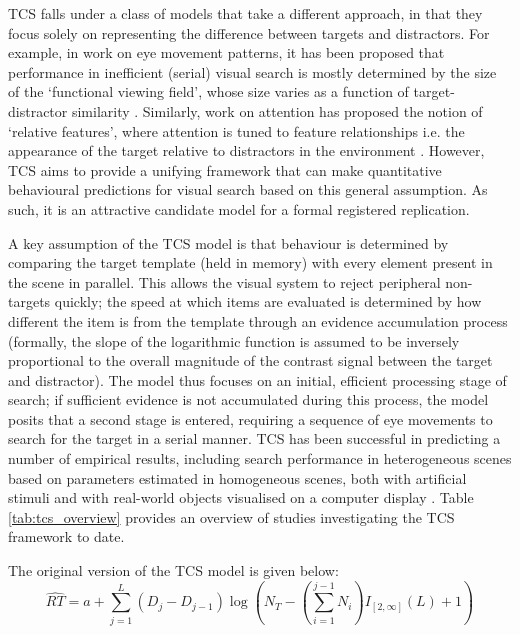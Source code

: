 \documentclass[smallextended, natbib]{svjour3}       %
\begin{document}
TCS falls under a class of models that take a different approach, in that they focus solely on representing the difference between targets and distractors. For example, in work on eye movement patterns, it has been proposed that performance in inefficient (serial) visual search is mostly determined by the size of the `functional viewing field', whose size varies as a function of target-distractor similarity \citep{hulleman2017brink}. Similarly, work on attention has proposed the notion of `relative features', where attention is tuned to feature relationships i.e. the appearance of the target relative to distractors in the environment \citep{becker2014color, becker2010role}. However, TCS \citep{lleras2020target} aims to provide a unifying framework that can make quantitative behavioural predictions for visual search based on this general assumption. As such, it is an attractive candidate model for a formal registered replication.

A key assumption of the TCS model is that behaviour is determined by comparing the target template (held in memory) with every element present in the scene in parallel. This allows the visual system to reject peripheral non-targets quickly; the speed at which items are evaluated is determined by how different the item is from the template through an evidence accumulation process (formally, the slope of the logarithmic function is assumed to be inversely proportional to the overall magnitude of the contrast signal between the target and distractor). The model thus focuses on an initial, efficient processing stage of search; if sufficient evidence is not accumulated during this process, the model posits that a second stage is entered, requiring a sequence of eye movements to search for the target in a serial manner. TCS has been successful in predicting a number of empirical results, including search performance in heterogeneous scenes based on parameters estimated in homogeneous scenes, both with artificial stimuli \citep{buetti2016towards,lleras2019predicting} and with real-world objects visualised on a computer display \citep{wang2017predicting}. Table \ref{tab:tcs_overview} provides an overview of studies investigating the TCS framework to date.
 
The original version of the TCS model is given below:
\begin{equation}
\hat{RT} = a + \sum_{j=1}^{L}(D_j-D_{j-1})\log{\left( N_T-\left(\sum_{i=1}^{j-1}N_i\right)I_{[2,\infty]}(L)+1\right)}
\label{eq:tcs}
\end{equation}
\end{document}

